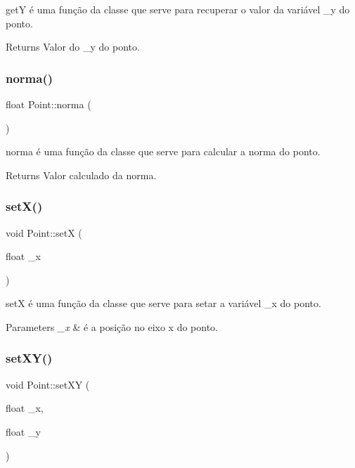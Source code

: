 getY é uma função da classe que serve para recuperar o valor da variável \+\_\+y do ponto. 

\begin{DoxyReturn}{Returns}
Valor do \+\_\+y do ponto. 
\end{DoxyReturn}
\mbox{\label{class_point_abd2618d1f505d9392893273a66e7c9b2}} 
\subsubsection{\texorpdfstring{norma()}{norma()}}
{\footnotesize\ttfamily float Point\+::norma (\begin{DoxyParamCaption}{ }\end{DoxyParamCaption})}



norma é uma função da classe que serve para calcular a norma do ponto. 

\begin{DoxyReturn}{Returns}
Valor calculado da norma. 
\end{DoxyReturn}
\mbox{\label{class_point_a428a1676e2fdec6753c42011a1d59d18}} 
\subsubsection{\texorpdfstring{set\+X()}{setX()}}
{\footnotesize\ttfamily void Point\+::setX (\begin{DoxyParamCaption}\item[{float}]{\+\_\+x }\end{DoxyParamCaption})}



setX é uma função da classe que serve para setar a variável \+\_\+x do ponto. 


\begin{DoxyParams}{Parameters}
{\em \+\_\+x} & é a posição no eixo x do ponto. \\
\hline
\end{DoxyParams}
\mbox{\label{class_point_ab5385c6d9bfa841e641e4709fc9f14cc}} 
\subsubsection{\texorpdfstring{set\+X\+Y()}{setXY()}}
{\footnotesize\ttfamily void Point\+::set\+XY (\begin{DoxyParamCaption}\item[{float}]{\+\_\+x,  }\item[{float}]{\+\_\+y }\end{DoxyParamCaption})}



